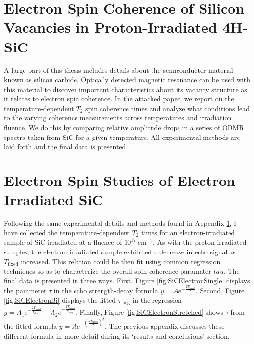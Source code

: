 \documentclass[oneside]{BYUPhys}
\begin{document}
\begin{appendices}

\chapter{Electron Spin Coherence of Silicon Vacancies in Proton-Irradiated 4H-SiC}
\label{sec:appenda}

A large part of this thesis includes details about the semiconductor material known as silicon carbide. Optically detected magnetic resonance can be used with this material to discover important characteristics about its vacancy structure as it relates to electron spin coherence. In the attached paper, we report on the temperature-dependent $T_2$ spin coherence times and analyze what conditions lead to the varying coherence measurements across temperatures and irradiation fluence. We do this by comparing relative amplitude drops in a series of ODMR spectra taken from SiC for a given temperature. All experimental methods are laid forth and the final data is presented.



\chapter{Electron Spin Studies of Electron Irradiated SiC}
\label{sec:appendb}

Following the same experimental details and methods found in Appendix \ref{sec:appenda}, I have collected the temperature-dependent $T_2$ times for an electron-irradiated sample of SiC irradiated at a fluence of $10^{17}~\text{cm}^{-2}$. As with the proton irradiated samples, the electron irradiated sample exhibited a decrease in echo signal as $T_{\text{fixed}}$ increased. This relation could be then fit using common regression techniques so as to characterize the overall spin coherence paramater $tau$. The final data is presented in three ways. First, Figure \ref{fig:SiCElectronSingle} displays the parameter $\tau$ in the echo strength-decay formula $y=A e^{-\frac{2T_{\text{fixed}}}{\tau}}$. Second, Figure \ref{fig:SiCElectronBi} displays the fitted $\tau_{\text{long}}$ in the regression $y=A_{1} e^{-\frac{2T_{\text{fixed}}}{\tau_{\text{short}}}} + A_{2} e^{-\frac{2T_{\text{fixed}}}{\tau_{\text{long}}}}$. Finally, Figure \ref{fig:SiCElectronStretched} shows $\tau$ from the fitted formula $y=A e^{-(\frac{2T_{\text{fixed}}}{\tau})^{\beta}}$. The previous appendix discusses these different formula in more detail during its `results and conclusions' section.
 

\end{appendices}
\end{document}
